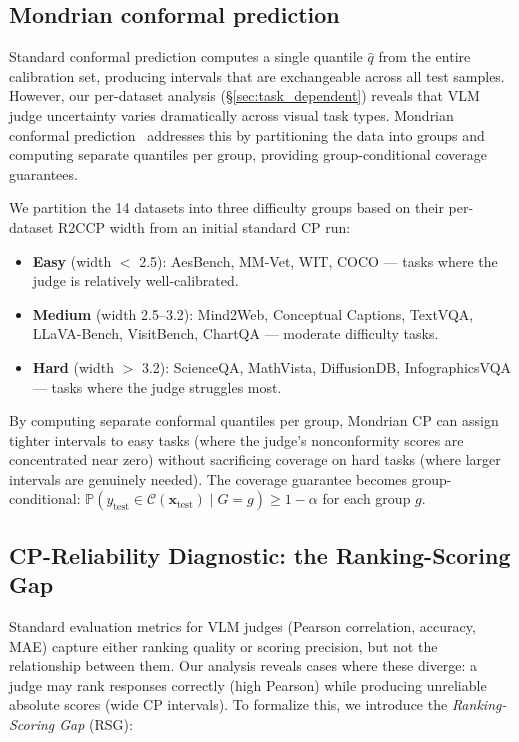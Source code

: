 \documentclass{article}
\begin{document}
\subsection{Mondrian conformal prediction}
\label{sec:mondrian}

Standard conformal prediction computes a single quantile $\hat{q}$ from the entire calibration set, producing intervals that are exchangeable across all test samples. However, our per-dataset analysis (\S\ref{sec:task_dependent}) reveals that VLM judge uncertainty varies dramatically across visual task types. Mondrian conformal prediction~\citep{vovk2005algorithmic} addresses this by partitioning the data into groups and computing separate quantiles per group, providing group-conditional coverage guarantees.

We partition the 14 datasets into three difficulty groups based on their per-dataset R2CCP width from an initial standard CP run:
\begin{itemize}[leftmargin=*,itemsep=1pt,topsep=2pt]
\item \textbf{Easy} (width $<$ 2.5): AesBench, MM-Vet, WIT, COCO --- tasks where the judge is relatively well-calibrated.
\item \textbf{Medium} (width 2.5--3.2): Mind2Web, Conceptual Captions, TextVQA, LLaVA-Bench, VisitBench, ChartQA --- moderate difficulty tasks.
\item \textbf{Hard} (width $>$ 3.2): ScienceQA, MathVista, DiffusionDB, InfographicsVQA --- tasks where the judge struggles most.
\end{itemize}

By computing separate conformal quantiles per group, Mondrian CP can assign tighter intervals to easy tasks (where the judge's nonconformity scores are concentrated near zero) without sacrificing coverage on hard tasks (where larger intervals are genuinely needed). The coverage guarantee becomes group-conditional: $\mathbb{P}(y_\text{test} \in \mathcal{C}(\mathbf{x}_\text{test}) \mid G = g) \geq 1 - \alpha$ for each group $g$.

\subsection{CP-Reliability Diagnostic: the Ranking-Scoring Gap}
\label{sec:rsg}

Standard evaluation metrics for VLM judges (Pearson correlation, accuracy, MAE) capture either ranking quality or scoring precision, but not the relationship between them. Our analysis reveals cases where these diverge: a judge may rank responses correctly (high Pearson) while producing unreliable absolute scores (wide CP intervals). To formalize this, we introduce the \emph{Ranking-Scoring Gap} (RSG):
\end{document}
